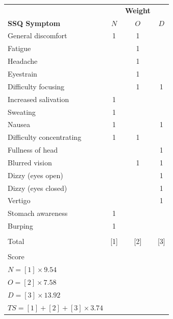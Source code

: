\begin{center}
    \begin{tabular}{ l c c c}
        \toprule
        \textbf{ } & \textbf{ } & \textbf{Weight} & \textbf{ } \\
        \textbf{SSQ Symptom} & \textbf{$N$} & \textbf{$O$} & \textbf{$D$} \\
        \midrule
        General discomfort          & 1 & 1 &   \\
        Fatigue                     &   & 1 &   \\
        Headache                    &   & 1 &   \\
        Eyestrain                   &   & 1 &   \\
        Difficulty focusing         &   & 1 & 1 \\
        Increased salivation        & 1 &   &   \\
        Sweating                    & 1 &   &   \\
        Nausea                      & 1 &   & 1 \\
        Difficulty concentrating    & 1 & 1 &   \\
        Fullness of head            &   &   & 1 \\
        Blurred vision              &   & 1 & 1 \\
        Dizzy (eyes open)           &   &   & 1 \\
        Dizzy (eyes closed)         &   &   & 1 \\
        Vertigo                     &   &   & 1 \\
        Stomach awareness           & 1 &   &   \\
        Burping                     & 1 &   &   \\
        \\
        Total                       & [1] & [2] & [3] \\
        \\
        Score & & & \\
        $N = [1] \times 9.54$ & & & \\
        $O = [2] \times 7.58$ & & & \\
        $D = [3] \times 13.92$ & & & \\
        $TS = [1] + [2] + [3] \times 3.74$ & & & \\
        \bottomrule
    \end{tabular}
    \label{tab:ssq-scoring}
\end{center}
